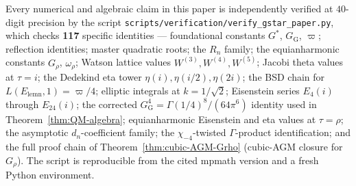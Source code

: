 \documentclass[11pt]{article}
\theoremstyle{definition}
\theoremstyle{remark}
\newcommand{\Gs}{G^{*}}
\newcommand{\GG}{G_{\!\scriptscriptstyle\mathrm{G}}}
\begin{document}
Every numerical and algebraic claim in this paper is independently
verified at $40$-digit precision by the script
\texttt{scripts/verification/verify\_gstar\_paper.py}, which checks
\textbf{117} specific identities --- foundational constants $\Gs$,
$\GG$, $\varpi$; reflection identities; master quadratic roots; the
$R_n$ family; the equianharmonic constants $G_\rho$, $\omega_\rho$;
Watson lattice values $W^{(3)}, W^{(4)}, W^{(5)}$; Jacobi theta values
at $\tau = i$; the Dedekind eta tower $\eta(i), \eta(i/2), \eta(2i)$;
the BSD chain for $L(E_{\mathrm{lemn}}, 1) = \varpi/4$; elliptic
integrals at $k = 1/\sqrt 2$; Eisenstein series $E_4(i)$ through
$E_{24}(i)$; the corrected $\GG^{4} = \Gamma(1/4)^{8}/(64\pi^{6})$
identity used in Theorem~\ref{thm:QM-algebra}; equianharmonic
Eisenstein and eta values at $\tau = \rho$; the asymptotic
$d_n$-coefficient family; the $\chi_{-4}$-twisted $\Gamma$-product
identification; and the full proof chain of
Theorem~\ref{thm:cubic-AGM-Grho} (cubic-AGM closure for $G_\rho$). The
script is reproducible from the cited mpmath version and a fresh
Python environment.
\end{document}
